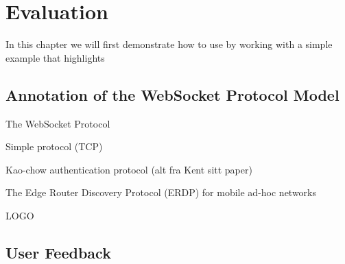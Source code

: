 \chapter{Evaluation}
\label{chap:evaluation}

In this chapter we will first demonstrate how to use \thename{} by working with
a simple example that highlights  

\section{Annotation of the WebSocket Protocol Model}

The WebSocket Protocol


Simple protocol (TCP)

Kao-chow authentication protocol (alt fra Kent sitt paper)

The Edge Router Discovery Protocol (ERDP) for mobile ad-hoc networks


LOGO

\section{User Feedback}




